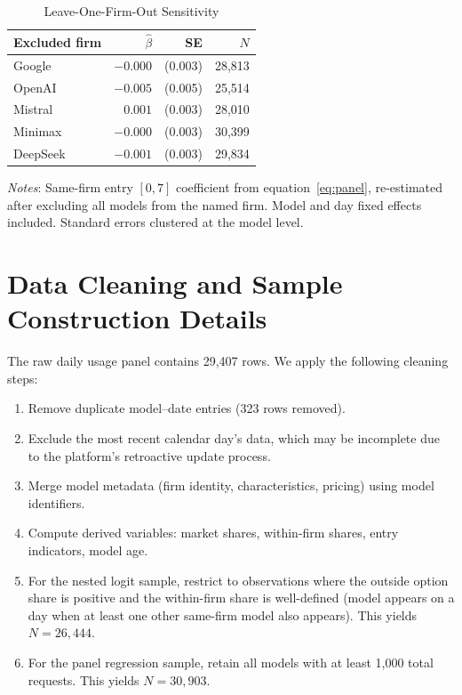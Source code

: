 \documentclass[11pt, a4paper]{article}
\begin{document}
\begin{appendices}
\begin{table}[H]
\centering
\caption{Leave-One-Firm-Out Sensitivity}
\label{tab:lofo}
\begin{threeparttable}
\begin{tabular}{lrrr}
\toprule
Excluded firm & $\hat{\beta}$ & SE & $N$ \\
\midrule
Google & $-0.000$ & (0.003) & 28,813 \\
OpenAI & $-0.005$ & (0.005) & 25,514 \\
Mistral & $0.001$ & (0.003) & 28,010 \\
Minimax & $-0.000$ & (0.003) & 30,399 \\
DeepSeek & $-0.001$ & (0.003) & 29,834 \\
\bottomrule
\end{tabular}
\begin{tablenotes}[flushleft]
\small
\item \textit{Notes}: Same-firm entry $[0,7]$ coefficient from equation~\eqref{eq:panel}, re-estimated after excluding all models from the named firm. Model and day fixed effects included. Standard errors clustered at the model level.
\end{tablenotes}
\end{threeparttable}
\end{table}

\section{Data Cleaning and Sample Construction Details}

The raw daily usage panel contains 29,407 rows. We apply the following cleaning steps:
\begin{enumerate}[nosep]
\item Remove duplicate model--date entries (323 rows removed).
\item Exclude the most recent calendar day's data, which may be incomplete due to the platform's retroactive update process.
\item Merge model metadata (firm identity, characteristics, pricing) using model identifiers.
\item Compute derived variables: market shares, within-firm shares, entry indicators, model age.
\item For the nested logit sample, restrict to observations where the outside option share is positive and the within-firm share is well-defined (model appears on a day when at least one other same-firm model also appears). This yields $N = 26{,}444$.
\item For the panel regression sample, retain all models with at least 1,000 total requests. This yields $N = 30{,}903$.
\end{enumerate}


\end{appendices}
\end{document}
